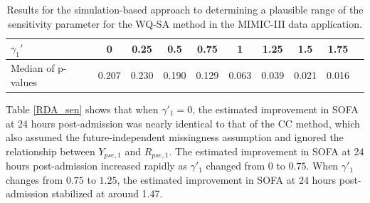\documentclass[12pt]{article}
\begin{document}
\begin{table}[htbp]
    \centering
    \caption{Results for the simulation-based approach to determining  a plausible range of the sensitivity parameter for the WQ-SA method  in the  MIMIC-III data application. }
    \begin{tabular}{lccccccccc}
    \hline
   $\gamma_1'$  & 0 & 0.25 & 0.5 & 0.75 & 1 & 1.25 & 1.5  & 1.75  \\
    \hline
     Median of  p-values & 0.207 & 0.230 & 0.190 & 0.129 & 0.063 & 0.039 & 0.021 & 0.016  \\
    \hline
    \end{tabular}
    \label{RDA_sen_spec}
\end{table}


Table \ref{RDA_sen} shows that when $\gamma'_1=0$, the estimated improvement in SOFA at 24 hours post-admission was nearly identical to that of the CC method, which also assumed the future-independent missingness assumption and ignored the relationship between $Y_{pse,1}$ and $R_{pse,1}$. The estimated improvement in SOFA at 24 hours post-admission increased rapidly as $\gamma'_1$ changed from $0$ to $0.75$. When $\gamma'_1$ changes from $0.75$ to $1.25$, the estimated improvement in SOFA at 24 hours post-admission stabilized at around 1.47.   
\end{document}
